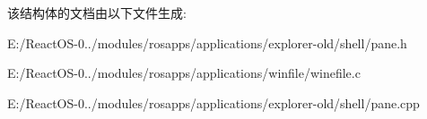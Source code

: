该结构体的文档由以下文件生成\+:\begin{DoxyCompactItemize}
\item 
E\+:/\+React\+O\+S-\/0../modules/rosapps/applications/explorer-\/old/shell/pane.\+h\item 
E\+:/\+React\+O\+S-\/0../modules/rosapps/applications/winfile/winefile.\+c\item 
E\+:/\+React\+O\+S-\/0../modules/rosapps/applications/explorer-\/old/shell/pane.\+cpp\end{DoxyCompactItemize}
